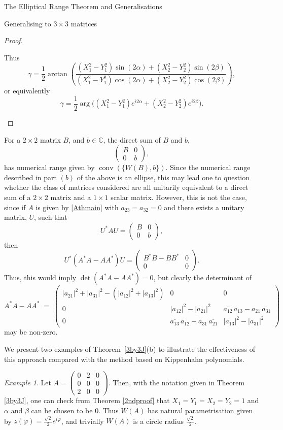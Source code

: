 \documentclass[12pt]{article}
\theoremstyle{plain}
\theoremstyle{definition}
\theoremstyle{remark}
\renewcommand{\phi}{\varphi}
\newtheorem{Example}[Theorem]{Example}
\numberwithin{equation}{section}
\begin{document}
\begin{section}{The Elliptical Range Theorem and Generalisations}
\begin{subsection}{Generalising to $3 \times 3$ matrices}
\begin{proof}
\begin{enumerate}
Thus
\[
\gamma = \frac{1}{2} \arctan \left( \frac{(X_1^2-Y_1^2)\sin(2\alpha) + (X_2^2-Y_2^2)\sin(2\beta)}{ (X_1^2-Y_1^2)\cos(2\alpha) + (X_2^2-Y_2^2)\cos(2\beta)} \right),
\]
or equivalently
\[
\gamma = \frac12 \arg\Big( (X_1^2-Y_1^2)e^{i2\alpha} + (X_2^2-Y_2^2)e^{i2\beta} \Big).
\]

\end{enumerate}
\end{proof}



For a $2 \times 2$ matrix $B$, and $b \in \mathbb{C}$, the direct sum of $B$ and $b$,
$$
\begin{pmatrix}
    B & 0 \\
    0 & b
\end{pmatrix},
$$
has numerical range given by $\operatorname{conv}(\{W(B), b \})$. Since the numerical range described in part $(b)$ of the above is an ellipse, this may lead one to question whether the class of matrices considered are all unitarily equivalent to a direct sum of a $2 \times 2$ matrix and a $1 \times 1$ scalar matrix. However, this is not the case, since if $A$ is given by \eqref{Athmain} with $a_{23} = a_{32} = 0$ and there exists a unitary matrix, $U$, such that 
$$
U^*A U = \begin{pmatrix}
    B & 0 \\
    0 & b
\end{pmatrix},
$$
then 
$$
U^*(A^*A - AA^*)U = \begin{pmatrix}
    B^*B - BB^* & 0 \\
    0 & 0
\end{pmatrix}.
$$
Thus, this would imply $\det (A^*A-AA^*)  =0 $, but clearly the determinant of
\[
A^*A - AA^* \;=\;
\begin{pmatrix}
|a_{21}|^2 + |a_{31}|^2 - (|a_{12}|^2 + |a_{13}|^2) & 0 & 0 \\ 
0 & |a_{12}|^2 - |a_{21}|^2 & \overline{a_{12}}\,a_{13} - a_{21}\,\overline{a_{31}} \\ 
0 & \overline{a_{13}}\,a_{12} - a_{31}\,\overline{a_{21}} & |a_{13}|^2 - |a_{31}|^2
\end{pmatrix}
\]
may be non-zero.


We present two examples of Theorem~\ref{3by3J}(b) to illustrate the effectiveness of this approach compared with the method based on Kippenhahn polynomials.


\begin{Example}
    Let $A= \begin{pmatrix}
        0 & 2 & 0 \\
        0 & 0 & 0\\
        2 & 0 & 0
    \end{pmatrix}$. Then, with the notation given in Theorem \ref{3by3J}, one can check from Theorem \ref{2ndproof} that $X_1=Y_1=X_2=Y_2 = 1$ and $\alpha $ and $ \beta $ can be chosen to be 0. Thus $W(A)$ has natural parametrisation given by $z(\phi) = \frac{\sqrt{2}}{2}e^{i \phi}$, and trivially $W(A)$ is a circle radius $\frac{\sqrt{2}}{2}$.
\end{Example}


\end{subsection}
\end{section}
\end{document}
